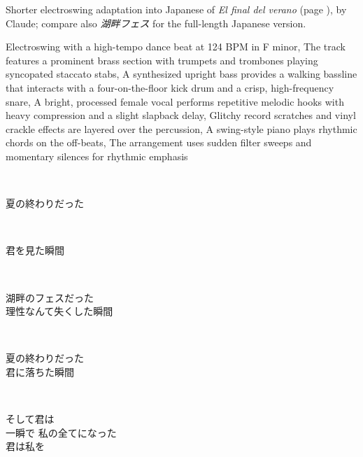 
\begin{notes}
Shorter electroswing adaptation into Japanese of \emph{El final del verano} (page \pageref{sec:verano}), by Claude; compare also \emph{\japanesefont 湖畔フェス} for the full-length Japanese version.
\end{notes}
\begin{style}
Electroswing with a high-tempo dance beat at 124 BPM in F minor, The track features a prominent brass section with trumpets and trombones playing syncopated staccato stabs, A synthesized upright bass provides a walking bassline that interacts with a four-on-the-floor kick drum and a crisp, high-frequency snare, A bright, processed female vocal performs repetitive melodic hooks with heavy compression and a slight slapback delay, Glitchy record scratches and vinyl crackle effects are layered over the percussion, A swing-style piano plays rhythmic chords on the off-beats, The arrangement uses sudden filter sweeps and momentary silences for rhythmic emphasis
\end{style}
\begin{lyrics}
\\
\begin{japanese}
夏の終わりだった\\
\end{japanese}
\\
\begin{japanese}
君を見た瞬間\\
\end{japanese}
\\
\begin{japanese}
湖畔のフェスだった\\
理性なんて失くした瞬間
\end{japanese}

\\
\begin{japanese}
夏の終わりだった\\
君に落ちた瞬間
\end{japanese}

\\
\begin{japanese}
そして君は\\
一瞬で 私の全てになった\\
君は私を
\end{japanese}
\end{lyrics}

